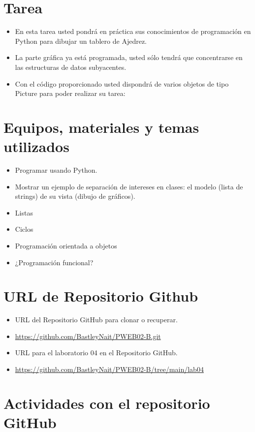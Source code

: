 \documentclass{article}
\begin{document}
	\section{Tarea}
	\begin{itemize}		
		\item En esta tarea usted pondrá en práctica sus conocimientos de programación en Python para dibujar un tablero de Ajedrez.
		\item La parte gráfica ya está programada, usted sólo tendrá que concentrarse en las estructuras de datos subyacentes.
		\item Con el código proporcionado usted dispondrá de varios objetos de tipo Picture para poder realizar su tarea:
	\end{itemize}
		
	\section{Equipos, materiales y temas utilizados}
	\begin{itemize}
		\item Programar usando Python.
		\item Mostrar un ejemplo de separación de intereses en clases: el modelo (lista de strings) de su vista (dibujo de gráficos).	
		\item Listas
		\item Ciclos
		\item Programación orientada a objetos
		\item ¿Programación funcional?
		
	\end{itemize}
	
	\section{URL de Repositorio Github}
	\begin{itemize}
		\item URL del Repositorio GitHub para clonar o recuperar.
		\item \url{https://github.com/BastleyNait/PWEB02-B.git}
		\item URL para el laboratorio 04 en el Repositorio GitHub.
		\item \url{https://github.com/BastleyNait/PWEB02-B/tree/main/lab04}
	\end{itemize}
	
	\section{Actividades con el repositorio GitHub}
	
\end{document}

